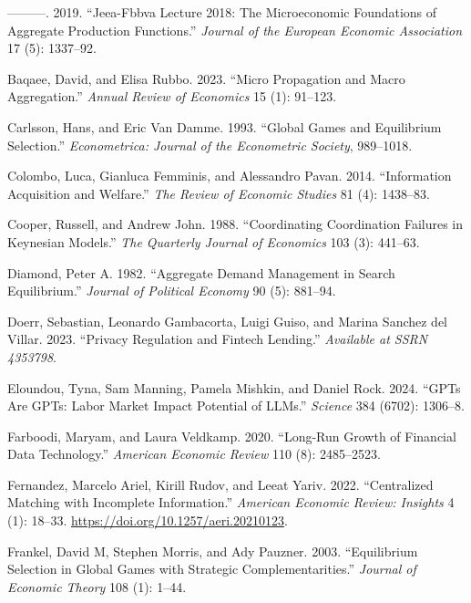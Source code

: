 \documentclass[
]{article}
\newlength{\cslhangindent}
\newenvironment{CSLReferences}[2] %
 {\begin{list}{}{%
  \setlength{\itemindent}{0pt}
  \setlength{\leftmargin}{0pt}
  \setlength{\parsep}{0pt}
  \ifodd #1
   \setlength{\leftmargin}{\cslhangindent}
   \setlength{\itemindent}{-1\cslhangindent}
  \fi
  \setlength{\itemsep}{#2\baselineskip}}}
 {\end{list}}
\theoremstyle{plain}
\theoremstyle{definition}
\theoremstyle{remark}
\begin{document}
\begin{CSLReferences}{1}{0}
---------. 2019. {``Jeea-Fbbva Lecture 2018: The Microeconomic
Foundations of Aggregate Production Functions.''} \emph{Journal of the
European Economic Association} 17 (5): 1337--92.

Baqaee, David, and Elisa Rubbo. 2023. {``Micro Propagation and Macro
Aggregation.''} \emph{Annual Review of Economics} 15 (1): 91--123.

Carlsson, Hans, and Eric Van Damme. 1993. {``Global Games and
Equilibrium Selection.''} \emph{Econometrica: Journal of the Econometric
Society}, 989--1018.

Colombo, Luca, Gianluca Femminis, and Alessandro Pavan. 2014.
{``Information Acquisition and Welfare.''} \emph{The Review of Economic
Studies} 81 (4): 1438--83.

Cooper, Russell, and Andrew John. 1988. {``Coordinating Coordination
Failures in Keynesian Models.''} \emph{The Quarterly Journal of
Economics} 103 (3): 441--63.

Diamond, Peter A. 1982. {``Aggregate Demand Management in Search
Equilibrium.''} \emph{Journal of Political Economy} 90 (5): 881--94.

Doerr, Sebastian, Leonardo Gambacorta, Luigi Guiso, and Marina Sanchez
del Villar. 2023. {``Privacy Regulation and Fintech Lending.''}
\emph{Available at SSRN 4353798}.

Eloundou, Tyna, Sam Manning, Pamela Mishkin, and Daniel Rock. 2024.
{``GPTs Are GPTs: Labor Market Impact Potential of LLMs.''}
\emph{Science} 384 (6702): 1306--8.

Farboodi, Maryam, and Laura Veldkamp. 2020. {``Long-Run Growth of
Financial Data Technology.''} \emph{American Economic Review} 110 (8):
2485--2523.

Fernandez, Marcelo Ariel, Kirill Rudov, and Leeat Yariv. 2022.
{``Centralized Matching with Incomplete Information.''} \emph{American
Economic Review: Insights} 4 (1): 18--33.
\url{https://doi.org/10.1257/aeri.20210123}.

Frankel, David M, Stephen Morris, and Ady Pauzner. 2003. {``Equilibrium
Selection in Global Games with Strategic Complementarities.''}
\emph{Journal of Economic Theory} 108 (1): 1--44.


\end{CSLReferences}
\end{document}
